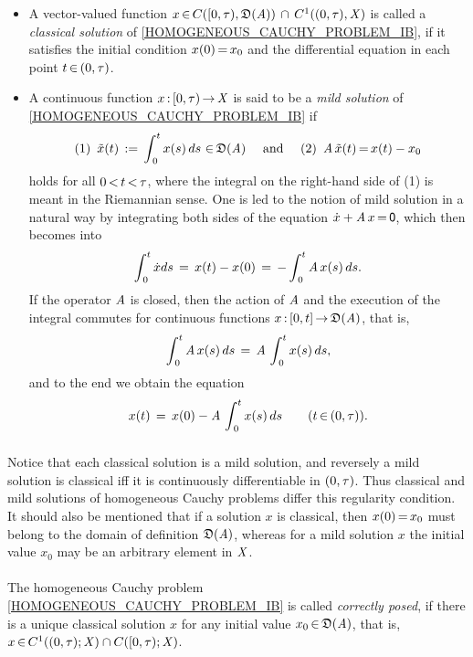 \documentclass[11pt,twoside]{article}
\begin{document}
\begin{itemize}[leftmargin=12pt]
\item[1.]
A vector-valued function
$x {\,\in\,} C([0,\tau),\mathfrak{D}(\mathit{A})) \, \cap \, C^1((0,\tau),\mathit{X})$
is called a \textit{classical solution}
of \eqref{HOMOGENEOUS_CAUCHY_PROBLEM_IB},
if it satisfies the initial condition $x(0) {\,=\,} x_0$
and the differential equation in each point $t {\,\in\,} (0,\tau)$.

\item[2.]
A continuous function $x {\,:\,} [0,\tau) {\,\to\,} \mathit{X}$ is said to be
a \textit{mild solution} of \eqref{HOMOGENEOUS_CAUCHY_PROBLEM_IB} if
\[
\mbox{(1) } \, \tilde{x}(t) \,:=\,
\int_{\,0}^t x(s) \, ds \, {\,\in\,} \mathfrak{D}(\mathit{A})
\quad \mbox{ and } \quad
\mbox{(2) } \, \mathit{A} \, \tilde{x}(t) {\,=\,} x(t)-x_0
\]
holds for all $0 {\,<\,} t {\,<\,} \tau$,
where the integral on the right-hand side of (1) 
is meant in the Riemannian sense.
One is led to the notion of mild solution in a natural way
by integrating both sides of the equation $\dot{x} + \mathit{A} \, x {\,=\,} {\mathsf{0}}$,
which then becomes into
\[
\int_{\,0}^t \dot{x} ds \,=\,
x(t)-x(0) \,=\, -
\int_{\,0}^t \mathit{A} \, x(s) \, ds.
\]
If the operator $\mathit{A}$ is closed,
then the action of $\mathit{A}$ and the execution of the integral commutes
for continuous functions $x {\,:\,} [0,t] {\,\to\,} \mathfrak{D}(\mathit{A})$,
that is,
\[
\int_{\,0}^t \mathit{A} \, x(s) \, ds  \,=\, \mathit{A} \, \int_{\,0}^t x(s) \, ds,
\]
and to the end we obtain the equation
\[
x(t) \,=\, x(0) - \mathit{A} \, \int_{\,0}^t x(s) \,ds
\quad \quad (t {\,\in\,} (0,\tau)).
\]
\end{itemize}

\subparagraph{} %
Notice that each classical solution is a mild solution,
and reversely a mild solution is classical
iff it is continuously differentiable in $(0,\tau)$.
Thus classical and mild solutions of homogeneous Cauchy problems
differ {\wrt} this regularity condition.
It should also be mentioned
that if a solution $x$ is classical,
then $x(0) {\,=\,} x_0$ must belong to the domain of definition $\mathfrak{D}(\mathit{A})$,
whereas for a mild solution $x$
the initial value $x_0$ may be an arbitrary element in $\mathit{X}$.

\paragraph{} %
The homogeneous Cauchy problem \eqref{HOMOGENEOUS_CAUCHY_PROBLEM_IB}
is called \textit{correctly posed},
if there is a unique classical solution $x$
for any initial value $x_0 {\,\in\,} \mathfrak{D}(\mathit{A})$,
that is,
$x {\,\in\,} C^1((0,\tau);\mathit{X}) \cap C([0,\tau);\mathit{X})$.
\end{document}
